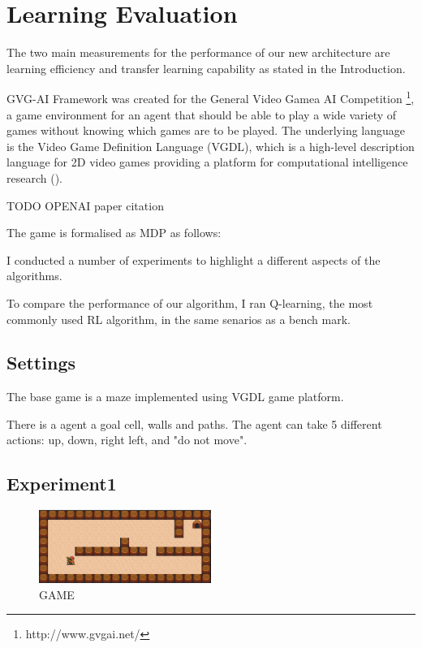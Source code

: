 \section{Learning Evaluation}
\label{learning_evaluation}

The two main measurements for the performance of our new architecture are learning efficiency and transfer learning capability as stated in the Introduction.

GVG-AI Framework was created for the General Video Gamea AI Competition \footnote{http://www.gvgai.net/}, 
a game environment for an agent that should be able to play a wide variety of games without knowing which games are to be played.
The underlying language is the Video Game Definition Language (VGDL), which is a high-level description language for 2D video games providing a platform for computational intelligence research (\cite{Schaul2013}).

TODO OPENAI paper citation

The game is formalised as MDP as follows:

I conducted a number of experiments to highlight a different aspects of the algorithms. 

To compare the performance of our algorithm, I ran Q-learning, the most commonly used RL algorithm, in the same senarios as a bench mark. 

\subsection{Settings}
The base game is a maze implemented using VGDL game platform. 

There is a agent a goal cell, walls and paths. The agent can take 5 different actions: up, down, right left, and "do not move".  

\subsection{Experiment1}

\begin{figure}[!htb]
\centering
\includegraphics[width=0.5\textwidth]{./figures/experiment1}
\caption{GAME }
\label{experiment1}
\end{figure}

